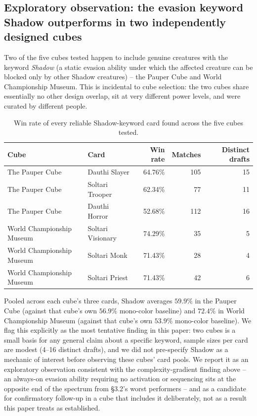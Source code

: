 \documentclass[11pt]{article}
\begin{document}
\subsection{Exploratory observation: the evasion keyword Shadow outperforms in two independently designed cubes}

Two of the five cubes tested happen to include genuine creatures with the
keyword \emph{Shadow} (a static evasion ability under which the affected creature
can be blocked only by other Shadow creatures) -- the Pauper Cube and World
Championship Museum. This is incidental to cube selection: the two cubes share
essentially no other design overlap, sit at very different power levels, and were
curated by different people.

\begin{table}[h]
\centering
\caption{Win rate of every reliable Shadow-keyword card found across the five
cubes tested.}
\label{tab:shadow}
\small
\begin{tabular}{llrrr}
\toprule
Cube & Card & Win rate & Matches & Distinct drafts \\
\midrule
The Pauper Cube & Dauthi Slayer & 64.76\% & 105 & 15 \\
The Pauper Cube & Soltari Trooper & 62.34\% & 77 & 11 \\
The Pauper Cube & Dauthi Horror & 52.68\% & 112 & 16 \\
World Championship Museum & Soltari Visionary & 74.29\% & 35 & 5 \\
World Championship Museum & Soltari Monk & 71.43\% & 28 & 4 \\
World Championship Museum & Soltari Priest & 71.43\% & 42 & 6 \\
\bottomrule
\end{tabular}
\end{table}

Pooled across each cube's three cards, Shadow averages $59.9\%$ in the Pauper
Cube (against that cube's own $56.9\%$ mono-color baseline) and $72.4\%$ in World
Championship Museum (against that cube's own $53.9\%$ mono-color baseline). We
flag this explicitly as the most tentative finding in this paper: two cubes is a
small basis for any general claim about a specific keyword, sample sizes per card
are modest (4--16 distinct drafts), and we did not pre-specify Shadow as a
mechanic of interest before observing these cubes' card pools. We report it as an
exploratory observation consistent with the complexity-gradient finding above --
an always-on evasion ability requiring no activation or sequencing sits at the
opposite end of the spectrum from \S3.2's worst performers -- and as a candidate
for confirmatory follow-up in a cube that includes it deliberately, not as a
result this paper treats as established.
\end{document}
